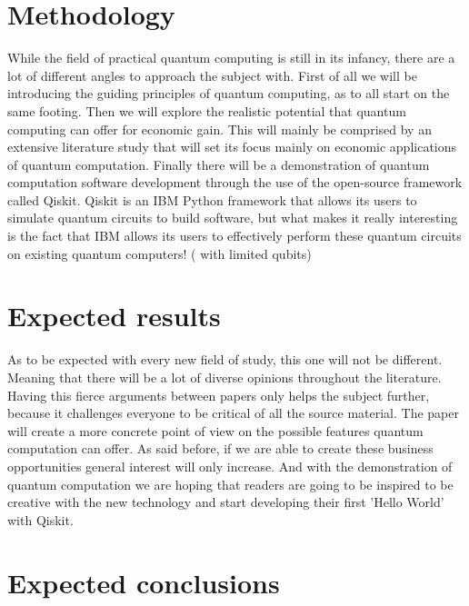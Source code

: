 \section{Methodology}
\label{sec:methodologie}

While the field of practical quantum computing is still in its infancy, there are a lot of different angles to approach the subject with. First of all we will be introducing the guiding principles of quantum computing, as to all start on the same footing. Then we will explore the realistic potential that quantum computing can offer for economic gain. This will mainly be comprised by an extensive literature study that will set its focus mainly on economic applications of quantum computation.
Finally there will be a demonstration of quantum computation software development through the use of the open-source framework called Qiskit. \autocite{Qiskit} Qiskit is an IBM Python framework that allows its users to simulate quantum circuits to build software, but what makes it really interesting is the fact that IBM allows its users to effectively perform these quantum circuits on existing quantum computers! ( with limited qubits)

\section{Expected results}
\label{sec:verwachte_resultaten}

As to be expected with every new field of study, this one will not be different. Meaning that there will be a lot of diverse opinions throughout the literature. Having this fierce arguments between papers only helps the subject further, because it challenges everyone to be critical of all the source material. The paper will create a more concrete point of view on the possible features quantum computation can offer. As said before, if we are able to create these business opportunities general interest will only increase. And with the demonstration of quantum computation we are hoping that readers are going to be inspired to be creative with the new technology and start developing their first 'Hello World' with Qiskit.

\section{Expected conclusions}
\label{sec:verwachte_conclusies}

